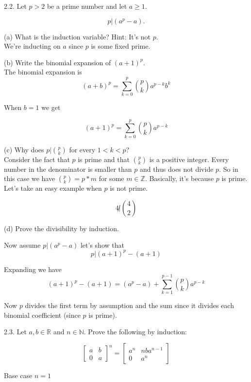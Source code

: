 \documentclass[16 pt]{amsart}
\theoremstyle{definition}
\theoremstyle{remark}
\numberwithin{equation}{subsection}
\newcommand{\R}{\mathbb{R}}
\newcommand{\Z}{\mathbb{Z}}
\begin{document}
2.2.  Let $p>2$ be a prime number and let $a\ge 1$.  

\[
p | (a^p-a).
\]

(a) What is the induction variable?  Hint: It's not $p$.\\

We're inducting on $a$ since $p$ is some fixed prime.



(b) Write the binomial expansion of $(a+1)^p$.\\


The binomial expansion is
\[
(a+b)^p = \sum_{k=0}^{p}\binom{p}{k}a^{p-k}b^k
\]

When $b=1$ we get

\[
(a+1)^p = \sum_{k=0}^{p}\binom{p}{k}a^{p-k}
\]




(c) Why does $p| \binom{p}{k}$ for every $1<k<p$?\\

Consider the fact that $p$ is prime and that $\binom{p}{k}$ is a positive integer. Every number in the denominator is smaller than $p$ and thus does not divide $p$.  So in this case we have $\binom{p}{k} = p*m$ for some $m\in \Z$.  Basically, it's because $p$ is prime.  Let's take an easy example when $p$ is not prime.

\[
4 \not| \binom{4}{2} 
\]


(d) Prove the divisibility by induction.


Now assume $p | (a^p-a)$ let's show that
\[
p | (a+1)^p-(a+1)
\]

Expanding we have
\[
(a+1)^p - (a+1) = (a^p-a)+ \sum_{k=1}^{p-1}\binom{p}{k}a^{p-k}
\]

Now $p$ divides the first term by assumption and the sum since it divides each binomial coefficient (since $p$ is prime).





2.3.  Let $a,b\in \R$ and $n\in \mathbb{N}$.  Prove the following by induction:

\[
\begin{bmatrix}
a & b \\
0 & a
\end{bmatrix}^n = \begin{bmatrix}
a^n & nba^{n-1}\\
0 & a^n
\end{bmatrix}
\]



Base case $n=1$
\end{document}
